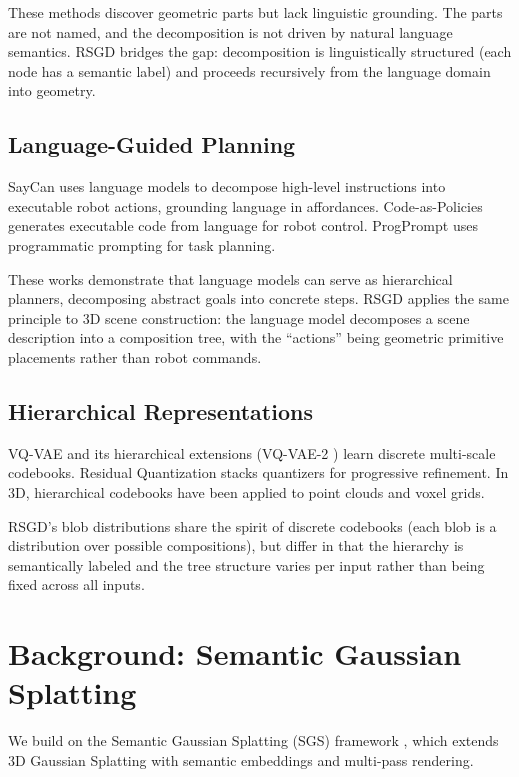 \documentclass[11pt]{article}
\begin{document}
These methods discover geometric parts but lack linguistic grounding. The parts are not named, and the decomposition is not driven by natural language semantics. RSGD bridges the gap: decomposition is linguistically structured (each node has a semantic label) and proceeds recursively from the language domain into geometry.

\subsection{Language-Guided Planning}

SayCan \cite{ahn2022} uses language models to decompose high-level instructions into executable robot actions, grounding language in affordances. Code-as-Policies \cite{liang2023code} generates executable code from language for robot control. ProgPrompt \cite{singh2023} uses programmatic prompting for task planning.

These works demonstrate that language models can serve as hierarchical planners, decomposing abstract goals into concrete steps. RSGD applies the same principle to 3D scene construction: the language model decomposes a scene description into a composition tree, with the ``actions'' being geometric primitive placements rather than robot commands.

\subsection{Hierarchical Representations}

VQ-VAE \cite{vanoord2017} and its hierarchical extensions (VQ-VAE-2 \cite{razavi2019}) learn discrete multi-scale codebooks. Residual Quantization \cite{lee2022} stacks quantizers for progressive refinement. In 3D, hierarchical codebooks have been applied to point clouds and voxel grids.

RSGD's blob distributions share the spirit of discrete codebooks (each blob is a distribution over possible compositions), but differ in that the hierarchy is semantically labeled and the tree structure varies per input rather than being fixed across all inputs.

\section{Background: Semantic Gaussian Splatting}

We build on the Semantic Gaussian Splatting (SGS) framework \cite{gorshkov2025}, which extends 3D Gaussian Splatting with semantic embeddings and multi-pass rendering.
\end{document}
